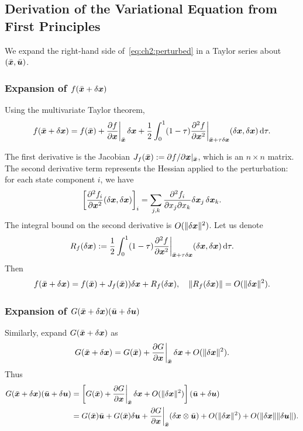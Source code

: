 \subsection{Derivation of the Variational Equation from First Principles}

We expand the right-hand side of~\eqref{eq:ch2:perturbed} in a Taylor series about
$(\bar{\bm{x}}, \bar{\bm{u}})$.

\subsubsection{Expansion of $f(\bar{\bm{x}}+\delta\bm{x})$}

Using the multivariate Taylor theorem,
\begin{equation}
f(\bar{\bm{x}}+\delta\bm{x}) = f(\bar{\bm{x}}) + \frac{\partial f}{\partial \bm{x}}\bigg|_{\bar{\bm{x}}}\,\delta\bm{x}
+ \frac{1}{2}\int_0^1(1-\tau)\frac{\partial^2 f}{\partial\bm{x}^2}\bigg|_{\bar{\bm{x}}+\tau\delta\bm{x}}(\delta\bm{x},\delta\bm{x})\,\mathrm{d}\tau.
\label{eq:ch2:f-taylor}
\end{equation}

The first derivative is the Jacobian $J_f(\bar{\bm{x}}) := \partial f/\partial\bm{x}|_{\bar{\bm{x}}}$, which
is an $n\times n$ matrix. The second derivative term represents the Hessian applied to the
perturbation: for each state component $i$, we have
\[
\left[\frac{\partial^2 f_i}{\partial\bm{x}^2}(\delta\bm{x},\delta\bm{x})\right]_i = \sum_{j,k}\frac{\partial^2 f_i}{\partial x_j\partial x_k}\delta\bm{x}_j\,\delta\bm{x}_k.
\]
The integral bound on the second derivative is $O(\|\delta\bm{x}\|^2)$. Let us denote
\[
R_f(\delta\bm{x}) := \frac{1}{2}\int_0^1(1-\tau)\frac{\partial^2 f}{\partial\bm{x}^2}\bigg|_{\bar{\bm{x}}+\tau\delta\bm{x}}(\delta\bm{x},\delta\bm{x})\,\mathrm{d}\tau.
\]
Then
\begin{equation}
f(\bar{\bm{x}}+\delta\bm{x}) = f(\bar{\bm{x}}) + J_f(\bar{\bm{x}}))\delta\bm{x} + R_f(\delta\bm{x}), \quad \|R_f(\delta\bm{x})\| = O(\|\delta\bm{x}\|^2).
\label{eq:ch2:f-expanded}
\end{equation}

\subsubsection{Expansion of $G(\bar{\bm{x}}+\delta\bm{x})(\bar{\bm{u}}+\delta\bm{u})$}

Similarly, expand $G(\bar{\bm{x}}+\delta\bm{x})$ as
\begin{equation}
G(\bar{\bm{x}}+\delta\bm{x}) = G(\bar{\bm{x}}) + \frac{\partial G}{\partial \bm{x}}\bigg|_{\bar{\bm{x}}}\,\delta\bm{x} + O(\|\delta\bm{x}\|^2).
\label{eq:ch2:G-taylor}
\end{equation}
Thus
\begin{align}
G(\bar{\bm{x}}+\delta\bm{x})(\bar{\bm{u}}+\delta\bm{u}) &= \left[G(\bar{\bm{x}}) + \frac{\partial G}{\partial \bm{x}}\bigg|_{\bar{\bm{x}}}\,\delta\bm{x} + O(\|\delta\bm{x}\|^2)\right](\bar{\bm{u}}+\delta\bm{u})\\
&= G(\bar{\bm{x}})\bar{\bm{u}} + G(\bar{\bm{x}})\delta\bm{u} + \frac{\partial G}{\partial \bm{x}}\bigg|_{\bar{\bm{x}}}(\delta\bm{x}\otimes\bar{\bm{u}})
+ O(\|\delta\bm{x}\|^2) + O(\|\delta\bm{x}\|\|\delta\bm{u}\|).
\label{eq:ch2:G-expanded}
\end{align}

